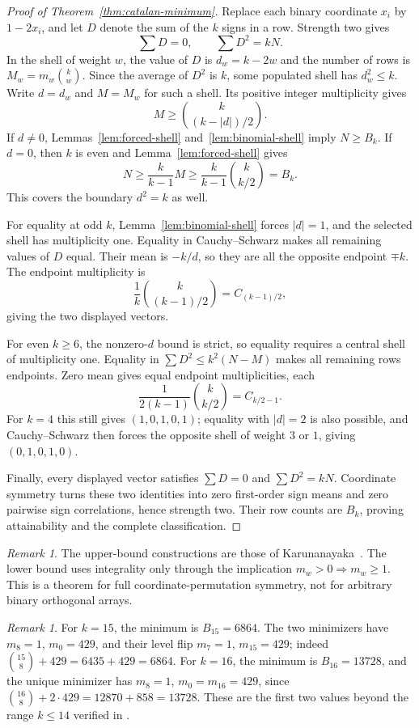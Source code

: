 \documentclass[11pt]{article}
\theoremstyle{remark}
\newtheorem{remark}[theorem]{Remark}
\numberwithin{equation}{section}
\begin{document}
\begin{proof}[Proof of Theorem~\ref{thm:catalan-minimum}]
Replace each binary coordinate $x_i$ by $1-2x_i$, and let $D$ denote the sum
of the $k$ signs in a row.  Strength two gives
\[
 \sum D=0,\qquad \sum D^2=kN.
\]
In the shell of weight $w$, the value of $D$ is $d_w=k-2w$ and the number of
rows is $M_w=m_w\binom{k}{w}$.
Since the average of $D^2$ is $k$, some populated shell has $d_w^2\le k$.
Write $d=d_w$ and $M=M_w$ for such a shell.  Its positive integer
multiplicity gives
\[
 M\ge\binom{k}{(k-|d|)/2}.
\]
If $d\ne0$, Lemmas~\ref{lem:forced-shell} and~\ref{lem:binomial-shell}
imply $N\ge B_k$.
If $d=0$, then $k$ is even and Lemma~\ref{lem:forced-shell} gives
\[
 N\ge\frac{k}{k-1}M
 \ge\frac{k}{k-1}\binom{k}{k/2}=B_k.
\]
This covers the boundary $d^2=k$ as well.

For equality at odd $k$, Lemma~\ref{lem:binomial-shell} forces $|d|=1$,
and the selected shell has multiplicity one.
Equality in Cauchy--Schwarz makes all remaining values of $D$ equal.
Their mean is $-k/d$, so they are all the opposite endpoint $\mp k$.
The endpoint multiplicity is
\[
 \frac1k\binom{k}{(k-1)/2}=C_{(k-1)/2},
\]
giving the two displayed vectors.

For even $k\ge6$, the nonzero-$d$ bound is strict, so equality requires a
central shell of multiplicity one.
Equality in $\sum D^2\le k^2(N-M)$ makes all remaining rows endpoints.
Zero mean gives equal endpoint multiplicities, each
\[
 \frac1{2(k-1)}\binom{k}{k/2}=C_{k/2-1}.
\]
For $k=4$ this still gives $(1,0,1,0,1)$; equality with $|d|=2$ is also
possible, and Cauchy--Schwarz then forces the opposite shell of weight
$3$ or $1$, giving $(0,1,0,1,0)$.

Finally, every displayed vector satisfies $\sum D=0$ and $\sum D^2=kN$.
Coordinate symmetry turns these two identities into zero first-order sign
means and zero pairwise sign correlations, hence strength two.
Their row counts are $B_k$, proving attainability and the complete
classification.
\end{proof}

\begin{remark}
The upper-bound constructions are those of
Karunanayaka~\cite{Karunanayaka2026}.  The lower bound uses integrality only
through the implication $m_w>0\Rightarrow m_w\ge1$.
This is a theorem for full coordinate-permutation symmetry, not for
arbitrary binary orthogonal arrays.
\end{remark}

\begin{remark}
For $k=15$, the minimum is $B_{15}=6864$.
The two minimizers have $m_8=1$, $m_0=429$, and their level flip
$m_7=1$, $m_{15}=429$; indeed $\binom{15}{8}+429=6435+429=6864$.
For $k=16$, the minimum is $B_{16}=13728$, and the unique minimizer has
$m_8=1$, $m_0=m_{16}=429$, since
$\binom{16}{8}+2\cdot429=12870+858=13728$.
These are the first two values beyond the range $k\le14$ verified in
\cite{Karunanayaka2026}.
\end{remark}
\end{document}
